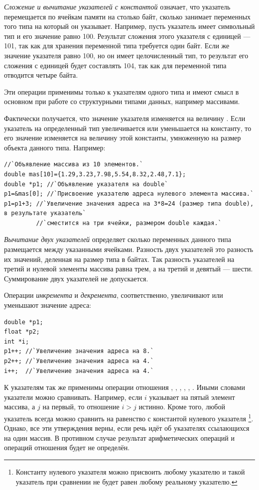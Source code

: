 \emph{Сложение и вычитание указателей с константой}  означает, что указатель
перемещается по ячейкам памяти на столько байт, сколько занимает  переменных того типа на который
он указывает. Например, пусть указатель имеет символьный тип и его значение равно 100. Результат сложения этого
указателя с единицей --- 101, так как для хранения переменной типа  требуется один байт. Если же
значение указателя равно 100, но он имеет целочисленный тип, то результат его сложения с единицей будет составлять 104,
так как для переменной типа  отводится четыре байта.

Эти операции применимы только к указателям одного типа и имеют смысл в основном при работе со структурными типами
данных, например массивами.

Фактически получается, что значение указателя изменяется на величину . Если указатель на
определенный тип увеличивается или уменьшается на константу, то его значение изменяется на величину этой константы,
умноженную на размер объекта данного типа. Например:
\begin{lstlisting}
//`Объявление массива из 10 элементов.`
double mas[10]={1.29,3.23,7.98,5.54,8.32,2.48,7.1}; 
double *p1; //`Объявление указателя на double`
p1=&mas[0]; //`Присвоение указателю адреса нулевого элемента массива.`
p1=p1+3; //`Увеличение значения адреса на 3*8=24 (размер типа double), в результате указатель`
         //`сместится на три ячейки, размером double каждая.`
\end{lstlisting}

\emph{Вычитание двух указателей} определяет сколько переменных данного типа размещается между указанными
ячейками. Разность двух указателей это разность их значений, деленная на размер типа в байтах. Так разность указателей
на третий и нулевой элементы массива равна трем, а на третий и девятый --- шести. Суммирование двух указателей не
допускается.

Операции \emph{инкремента} и \emph{декремента}, соответственно, увеличивают или уменьшают
значение адреса:
\begin{lstlisting}
double *p1;
float *p2; 
int *i; 
p1++; //`Увеличение значения адреса на 8.`
p2++; //`Увеличение значения адреса на 4.`
i++;  //`Увеличение значения адреса на 4.`
\end{lstlisting}

К указателям так же применимы {операции отношения} \Sys{==}, \Sys{!=},
\Sys{{<}}, \Sys{{>}}, \Sys{{<}=},
\Sys{{>}=}. Иными словами указатели можно сравнивать. Например, если $i$
указывает на пятый элемент массива, а $j$ на первый, то отношение $i>j$
истинно. Кроме того, любой указатель всегда можно сравнить на равенство с константой нулевого указателя
\footnote{Константу нулевого указателя можно присвоить любому указателю и такой указатель при сравнении не будет
равен любому реальному указателю.}. Однако, все эти утверждения верны, если речь идёт об указателях ссылающихся на один
массив. В противном случае результат арифметических операций и операций отношения будет не определён.

